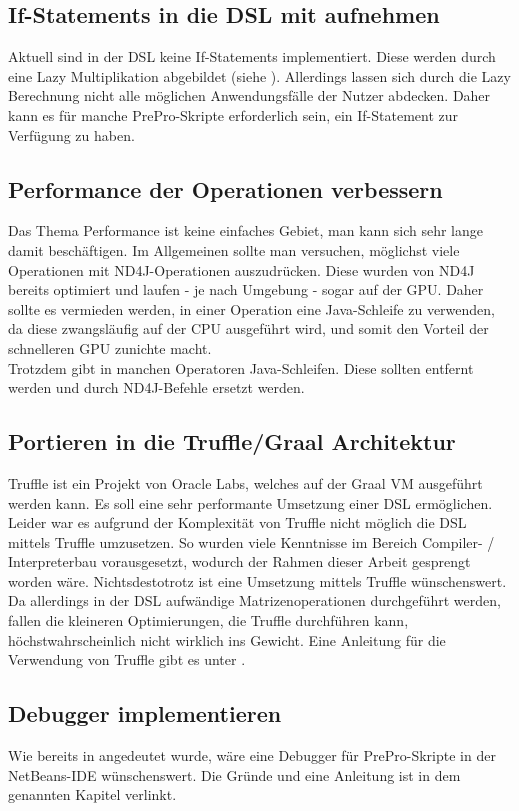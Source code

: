 \subsection{If-Statements in die \ac{DSL} mit aufnehmen}
Aktuell sind in der \ac{DSL} keine If-Statements implementiert.
Diese werden durch eine Lazy Multiplikation abgebildet (siehe ).
Allerdings lassen sich durch die Lazy Berechnung nicht alle möglichen Anwendungsfälle der Nutzer abdecken.
Daher kann es für manche PrePro-Skripte erforderlich sein, ein If-Statement zur Verfügung zu haben.

\subsection{Performance der Operationen verbessern}
Das Thema Performance ist keine einfaches Gebiet, man kann sich sehr lange damit beschäftigen.
Im Allgemeinen sollte man versuchen, möglichst viele Operationen mit ND4J-Operationen auszudrücken.
Diese wurden von ND4J bereits optimiert und laufen - je nach Umgebung - sogar auf der \ac{GPU}.
Daher sollte es vermieden werden, in einer Operation eine Java-Schleife zu verwenden, da diese zwangsläufig auf der \ac{CPU} ausgeführt wird, und somit den Vorteil der schnelleren \ac{GPU} zunichte macht.\\
Trotzdem gibt in manchen Operatoren Java-Schleifen.
Diese sollten entfernt werden und durch ND4J-Befehle ersetzt werden.

\subsection{Portieren in die Truffle/Graal Architektur}
Truffle ist ein Projekt von Oracle Labs, welches auf der Graal \ac{VM} ausgeführt werden kann.
Es soll eine sehr performante Umsetzung einer \ac{DSL} ermöglichen.
Leider war es aufgrund der Komplexität von Truffle nicht möglich die \ac{DSL} mittels Truffle umzusetzen.
So wurden viele Kenntnisse im Bereich Compiler- / Interpreterbau vorausgesetzt, wodurch der Rahmen dieser Arbeit gesprengt worden wäre.
Nichtsdestotrotz ist eine Umsetzung mittels Truffle wünschenswert.
Da allerdings in der \ac{DSL} aufwändige Matrizenoperationen durchgeführt werden, fallen die kleineren Optimierungen, die Truffle durchführen kann, höchstwahrscheinlich nicht wirklich ins Gewicht.
Eine Anleitung für die Verwendung von Truffle gibt es unter \cite{TruffleHowTo}.

\subsection{Debugger implementieren}
Wie bereits in  angedeutet wurde, wäre eine Debugger für PrePro-Skripte in der NetBeans-IDE wünschenswert.
Die Gründe und eine Anleitung ist in dem genannten Kapitel verlinkt.

